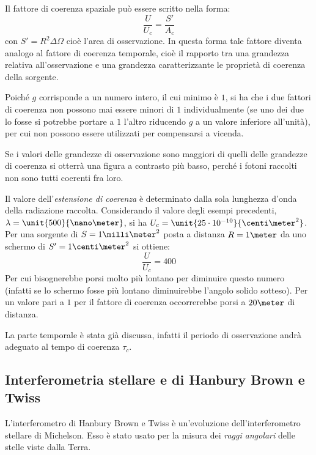 \begin{oss}
	Il fattore di coerenza spaziale può essere scritto nella forma:
	\[ \frac{U}{U_c} = \frac{S'}{A_c} \]
	con $ S' = R^2 \Delta\Omega $ cioè l'area di osservazione. In questa forma tale fattore diventa analogo al fattore di coerenza temporale, cioè il rapporto tra una grandezza relativa all'osservazione e una grandezza caratterizzante le proprietà di coerenza della sorgente.
\end{oss}

Poiché $ g $ corrisponde a un numero intero, il cui minimo è $ 1 $, si ha che i due fattori di coerenza non possono mai essere minori di $ 1 $ individualmente (se uno dei due lo fosse si potrebbe portare a $ 1 $ l'altro riducendo $ g $ a un valore inferiore all'unità), per cui non possono essere utilizzati per compensarsi a vicenda.

Se i valori delle grandezze di osservazione sono maggiori di quelli delle grandezze di coerenza si otterrà una figura a contrasto più basso, perché i fotoni raccolti non sono tutti coerenti fra loro.

\begin{es}
	Il valore dell'\textit{estensione di coerenza} è determinato dalla sola lunghezza d'onda della radiazione raccolta. Considerando il valore degli esempi precedenti, $ \lambda = \unit{500}{\nano\meter} $, si ha $ U_c = \unit{25\cdot10^{-10}}{\centi\meter^2}$. Per una sorgente di $ S = 1 \milli\meter^2 $ posta a distanza $ R = 1 \meter $ da uno schermo di $ S' = 1 \centi\meter^2 $ si ottiene:
	\[ \frac{U}{U_c} = 400 \]
	Per cui bisognerebbe porsi molto più lontano per diminuire questo numero (infatti se lo schermo fosse più lontano diminuirebbe l'angolo solido sotteso). Per un valore pari a $ 1 $ per il fattore di coerenza occorrerebbe porsi a $ 20 \meter $ di distanza.
	
	\noindent La parte temporale è stata già discussa, infatti il periodo di osservazione andrà adeguato al tempo di coerenza $ \tau_c $.
\end{es}

\subsection{Interferometria stellare e di Hanbury Brown e Twiss}

L'interferometro di Hanbury Brown e Twiss è un'evoluzione dell'interferometro stellare di Michelson. Esso è stato usato per la misura dei \textit{raggi angolari} delle stelle viste dalla Terra.

